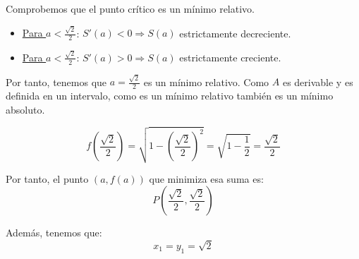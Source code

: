 \documentclass[12pt]{article}
\begin{document}
\begin{ejercicio} 
    Comprobemos que el punto crítico es un mínimo relativo.
    \begin{itemize}
        \item \underline{Para $a<\frac{\sqrt{2}}{2}$}: $S'(a)<0\Longrightarrow S(a)$ estrictamente decreciente.

        \item \underline{Para $a<\frac{\sqrt{2}}{2}$}: $S'(a)>0\Longrightarrow S(a)$ estrictamente creciente.
    \end{itemize}
    Por tanto, tenemos que $a=\frac{\sqrt{2}}{2}$ es un mínimo relativo. Como $A$ es derivable y es definida en un intervalo, como es un mínimo relativo también es un mínimo absoluto.

    \begin{equation*}
        f\left(\frac{\sqrt{2}}{2}\right)=\sqrt{1-\left(\frac{\sqrt{2}}{2}\right)^2} = \sqrt{1-\frac{1}{2}} = \frac{\sqrt{2}}{2}
    \end{equation*}

    Por tanto, el punto $(a,f(a))$ que minimiza esa suma es:
    \begin{equation*}
        P\left(\frac{\sqrt{2}}{2},\frac{\sqrt{2}}{2}\right)
    \end{equation*}

    Además, tenemos que:
    \begin{equation*}
        x_1=y_1 = \sqrt{2}
    \end{equation*}
    
    
    
\end{ejercicio}
\end{document}
